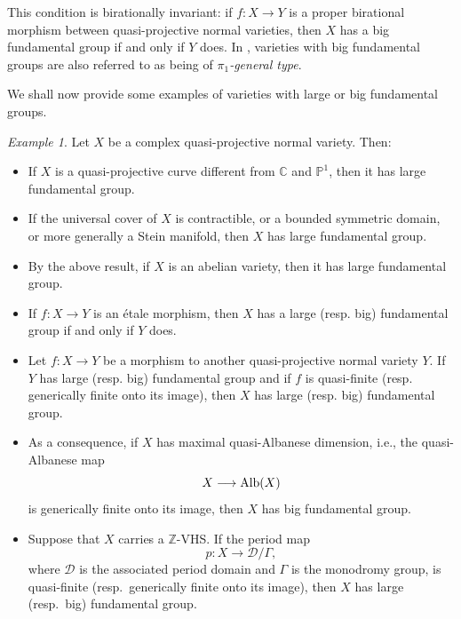 \documentclass[english]{amsproc}
\theoremstyle{plain}
\theoremstyle{definition}
\theoremstyle{remark}
\newtheorem{example}[thm]{Example}
\theoremstyle{plain}
\numberwithin{equation}{thm} %
\newcommand{\sD}{\mathscr{D}}
\begin{document}
	This condition is birationally invariant: if $f : X \to Y$ is a proper birational morphism between quasi-projective normal varieties, then $X$ has a big fundamental group if and only if $Y$ does. In \cite{Cam94}, varieties with big fundamental groups are also referred to as being of \emph{$\pi_1$-general type}.
	
	We shall now provide some examples of varieties with large or big fundamental groups.
	\begin{example}\label{exa:big}
		Let $X$ be a complex quasi-projective normal variety. Then:
		\begin{itemize}
			\item If $X$ is a quasi-projective curve different from $\mathbb{C}$ and $\mathbb{P}^1$, then it has large fundamental group.
			
			\item If the universal cover of $X$ is contractible, or a bounded symmetric domain, or more generally a Stein manifold, then $X$ has large fundamental group.
			
			\item By the above result, if $X$ is an abelian variety, then it has large fundamental group.
			
			\item If $f : X \to Y$ is an \'etale morphism, then $X$ has a large (resp. big) fundamental group if and only if $Y$ does.
			
			
			\item Let $f: X \to Y$ be a morphism to another quasi-projective normal variety $Y$.  
			If $Y$ has large (resp. big) fundamental group and if $f$ is quasi-finite (resp.  generically finite onto its image), then $X$ has large (resp. big) fundamental group.
			
			\item As a consequence, if $X$ has maximal quasi-Albanese dimension, i.e., the quasi-Albanese map 
			\[
			X \longrightarrow {\rm Alb}(X)
			\]
			is generically finite onto its image, then $X$ has big fundamental group.
			
			\item Suppose that $X$ carries a $\mathbb{Z}$-VHS.  
			If the period map 
			\[
			p : X \longrightarrow \sD/\Gamma,
			\]
			where $\sD$ is the associated period domain and $\Gamma$ is the monodromy group, is quasi-finite (resp.\ generically finite onto its image), then $X$ has large (resp.\ big) fundamental group.
		\end{itemize}
	\end{example}  
\end{document}
